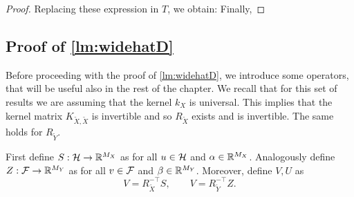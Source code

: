 \begin{proof}
Replacing these expression in $T$, we obtain:
Finally,
\end{proof}



\subsection{Proof of \cref{lm:widehatD}}


Before proceeding with the proof of \cref{lm:widehatD}, we introduce some operators, that will be useful also in the rest of the chapter. We recall that for this set of results we are assuming that the kernel $k_X$ is universal. This implies that the kernel matrix $K_{\tilde{X},\tilde{X}}$ is invertible and so $R_{\tilde{X}}$ exists and is invertible. The same holds for $R_{\tilde Y}$.

\begin{definition}\label{def:operators}
First define $S:\mathcal H \to \mathbb R^{M_X}$ as
for all $u \in \mathcal H$ and $\alpha \in \mathbb R^{M_X}$.
Analogously define $Z:{\cal F} \to \mathbb R^{M_Y}$ as
for all $v \in {\cal F}$ and $\beta \in \mathbb R^{M_Y}$.
Moreover, define $V, U$ as
$$V = R^{-\top}_{\tilde X} S, \qquad V = R^{-\top}_{\tilde Y} Z.$$
\end{definition}

